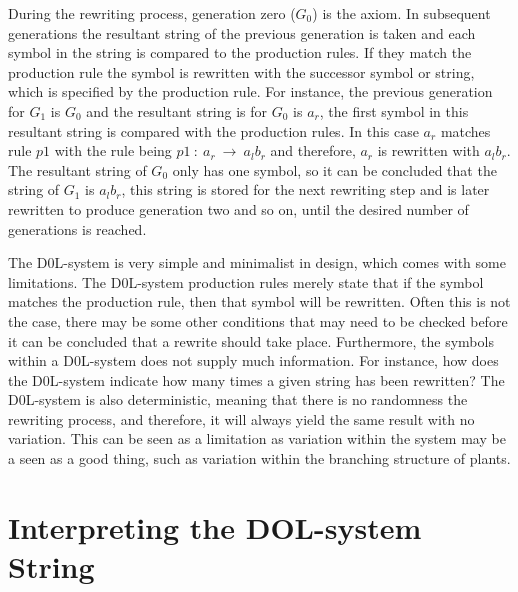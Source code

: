 \noindent
During the rewriting process, generation zero ($G_0$) is the axiom. In subsequent generations the resultant string of the previous generation is taken and each symbol in the string is compared to the production rules. If they match the production rule the symbol is rewritten with the successor symbol or string, which is specified by the production rule. For instance, the previous generation for $G_1$ is $G_0$ and the resultant string is for $G_0$ is $a_r$, the first symbol in this resultant string is compared with the production rules. In this case $a_r$ matches rule $p1$ with the rule being $p1~ :~ a_r~ \rightarrow~ a_l b_r$ and therefore, $a_r$ is rewritten with $a_l b_r$. The resultant string of $G_0$ only has one symbol, so it can be concluded that the string of $G_1$ is $a_l b_r$, this string is stored for the next rewriting step and is later rewritten to produce generation two and so on, until the desired number of generations is reached.

The D0L-system is very simple and minimalist in design, which comes with some limitations. The D0L-system production rules merely state that if the symbol matches the production rule, then that symbol will be rewritten. Often this is not the case, there may be some other conditions that may need to be checked before it can be concluded that a rewrite should take place. Furthermore, the symbols within a D0L-system does not supply much information. For instance, how does the D0L-system indicate how many times a given string has been rewritten? The D0L-system is also deterministic, meaning that there is no randomness the rewriting process, and therefore, it will always yield the same result with no variation. This can be seen as a limitation as variation within the system may be a seen as a good thing, such as variation within the branching structure of plants. 

\section{Interpreting the DOL-system String} \label{Interpreting DOL-system}

